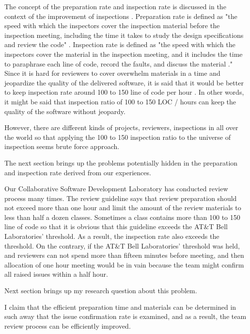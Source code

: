 \documentclass[11pt,twocolumn]{article}
\begin{document}
The concept of the preparation rate and inspection rate is discussed
in the context of the improvement of inspections \cite{Barnard1994}.
Preparation rate is defined as "the speed with which the inspectors
cover the inspection material before the inspection meeting,
including the time it takes to study the design specifications and
review the code" \cite{Barnard1994}.  Inspection rate is defined as
"the speed with which the inspectors cover the material in the
inspection meeting, and it includes the time to paraphrase each line
of code, record the faults, and discuss the material
\cite{Barnard1994}." Since it is hard for reviewers to cover
overwhelm materials in a time and jeopardize the quality of the
delivered software, it is said that it would be better to keep
inspection rate around 100 to 150 line of code per hour
\cite{Barnard1994}.  In other words, it might be said that
inspection ratio of 100 to 150 LOC / hours can keep the quality of
the software without jeopardy.

However, there are different kinds of projects, reviewers,
inspections in all over the world so that applying the 100 to 150
inspection ratio to the universe of inspection seems brute force
approach.

The next section brings up the problems potentially hidden in the
preparation and inspection rate derived from our experiences.

 \label{sec:problems}

Our Collaborative Software Development Laboratory has conducted
review process many times. The review guideline says that review
preparation should not exceed more than one hour and limit the
amount of the review materials to less than half a dozen classes.
Sometimes a class contains more than 100 to 150 line of code so that
it is obvious that this guideline exceeds the AT\&T Bell
Laboratories' threshold. As a result, the inspection rate also
exceeds the threshold. On the contrary, if the AT\&T Bell
Laboratories' threshold was held, and reviewers can not spend more
than fifteen minutes before meeting, and then allocation of one hour
meeting would be in vain because the team might confirm all raised
issues within a half hour.

Next section brings up my research question about this problem.

 \label{sec:researchQuestions}

I claim that the efficient preparation time and materials can be
determined in such away that the issue confirmation rate is
examined, and as a result, the team review process can be
efficiently improved.
\end{document}

